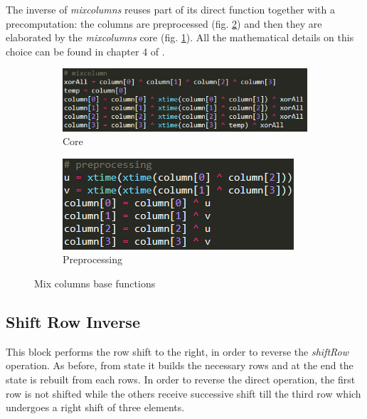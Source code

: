 \documentclass{article}
\begin{document}
The inverse of \textit{mixcolumns} reuses part of its direct function together with a precomputation: the columns are preprocessed (fig. \ref{fig:preprocessing}) and then they are elaborated by the \textit{mixcolumns} core (fig. \ref{fig:core}). All the mathematical details on this choice can be found in chapter 4 of \cite{10.5555/560131}. 

\begin{figure}[H]
\centering
\begin{subfigure}{.54\textwidth}
  \centering
  \includegraphics[width=1\linewidth]{images/mixcolumn.png}
  \caption{Core}
  \label{fig:core}
\end{subfigure}
\begin{subfigure}{.35\textwidth}
  \centering
  \includegraphics[width=1\linewidth]{images/preprocessing.png}
  \caption{Preprocessing}
  \label{fig:preprocessing}
\end{subfigure}
\caption{Mix columns base functions}
\label{fig:MixColumns}
\end{figure}

\subsection{Shift Row Inverse}

This block performs the row shift to the right, in order to reverse the \textit{shiftRow} operation. As before, from state it builds the necessary rows and at the end the state is rebuilt from each rows. In order to reverse the direct operation, the first row is not shifted while the others receive successive shift till the third row which undergoes a right shift of three elements.
\end{document}
